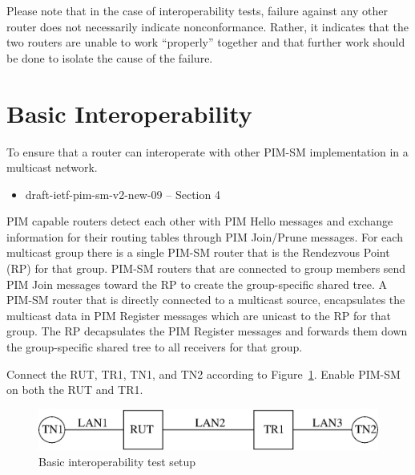 \documentclass[11pt]{report}
\begin{document}
Please note that in the case of interoperability tests, failure against any
other router does not necessarily indicate nonconformance. Rather, it
indicates that the two routers are unable to work ``properly'' together and
that further work should be done to isolate the cause of the failure.

\newpage
\section{Basic Interoperability}

To ensure that a router can interoperate with other PIM-SM
implementation in a multicast network.

\begin{itemize}
  \item draft-ietf-pim-sm-v2-new-09 -- Section 4
\end{itemize}

PIM capable routers detect each other with PIM Hello
messages and exchange information for their routing tables through
PIM Join/Prune messages. For each multicast group there is a single PIM-SM
router that is the Rendezvous Point (RP) for that group. PIM-SM routers that
are connected to group members send PIM Join messages toward the RP to create
the group-specific shared tree. A PIM-SM router that is directly connected to
a multicast source, encapsulates the multicast data in PIM Register messages
which are unicast to the RP for that group. The RP decapsulates the
PIM Register messages and forwards them down the group-specific shared tree to
all receivers for that group.

Connect the RUT, TR1, TN1, and TN2 according to
Figure~\ref{fig:pim_test_1_1_basic_interoperability}.
Enable PIM-SM on both the RUT and TR1.

\begin{figure}[htbp]
  \begin{center}
    \includegraphics[scale=0.8]{figs/pim_test_1_1_basic_interoperability}
    \caption{Basic interoperability test setup}
    \label{fig:pim_test_1_1_basic_interoperability}
  \end{center}
\end{figure}
\end{document}
